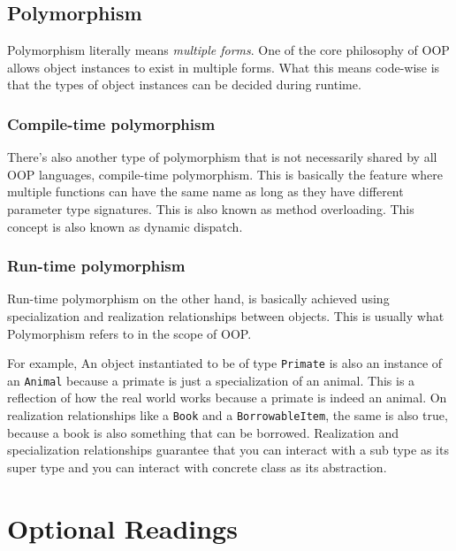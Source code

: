 \subsection{Polymorphism}\label{object-oriented-programming-paradigm.md__polymorphism}

Polymorphism literally means \emph{multiple forms}. One of the core
philosophy of OOP allows object instances to exist in multiple forms.
What this means code-wise is that the types of object instances can be
decided during runtime.

\subsubsection{Compile-time
polymorphism}\label{object-oriented-programming-paradigm.md__compile-time-polymorphism}

There's also another type of polymorphism that is not necessarily shared
by all OOP languages, compile-time polymorphism. This is basically the
feature where multiple functions can have the same name as long as they
have different parameter type signatures. This is also known as method
overloading. This concept is also known as dynamic dispatch.

\subsubsection{Run-time
polymorphism}\label{object-oriented-programming-paradigm.md__run-time-polymorphism}

Run-time polymorphism on the other hand, is basically achieved using
specialization and realization relationships between objects. This is
usually what Polymorphism refers to in the scope of OOP.

For example, An object instantiated to be of type \texttt{Primate} is
also an instance of an \texttt{Animal} because a primate is just a
specialization of an animal. This is a reflection of how the real world
works because a primate is indeed an animal. On realization
relationships like a \texttt{Book} and a \texttt{BorrowableItem}, the
same is also true, because a book is also something that can be
borrowed. Realization and specialization relationships guarantee that
you can interact with a sub type as its super type and you can interact
with concrete class as its abstraction.

\section{Optional
Readings}\label{object-oriented-programming-paradigm.md__optional-readings}

